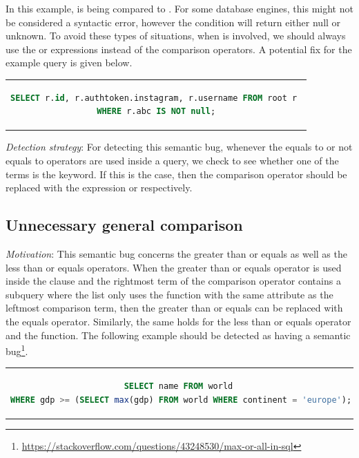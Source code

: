 In this example,  is being compared to . For some database engines, this might not be considered a syntactic error, however the condition will return either null or unknown. To avoid these types of situations, when  is involved, we should always use the  or  expressions instead of the comparison operators. A potential fix for the example query is given below.

\begin{center}
\begin{tabular}{c}
\begin{lstlisting}[language=SQL]
SELECT r.id, r.authtoken.instagram, r.username FROM root r 
WHERE r.abc IS NOT null;
\end{lstlisting}
\end{tabular}
\end{center}

\noindent \emph{Detection strategy}: For detecting this semantic bug, whenever the equals to or not equals to operators are used inside a query, we check to see whether one of the terms is the  keyword. If this is the case, then the comparison operator should be replaced with the expression  or  respectively.

\subsection{Unnecessary general comparison}
\emph{Motivation}: This semantic bug concerns the greater than or equals as well as the less than or equals operators. When the greater than or equals operator is used inside the  clause and the rightmost term of the comparison operator contains a subquery where the  list only uses the  function with the same attribute as the leftmost comparison term, then the greater than or equals can be replaced with the equals operator. Similarly, the same holds for the less than or equals operator and the  function. The following example should be detected as having a semantic bug\footnote{\url{https://stackoverflow.com/questions/43248530/max-or-all-in-sql}}.

\begin{center}
\begin{tabular}{c}
\begin{lstlisting}[language=SQL]
SELECT name FROM world 
WHERE gdp >= (SELECT max(gdp) FROM world WHERE continent = 'europe');
\end{lstlisting}
\end{tabular}
\end{center}

